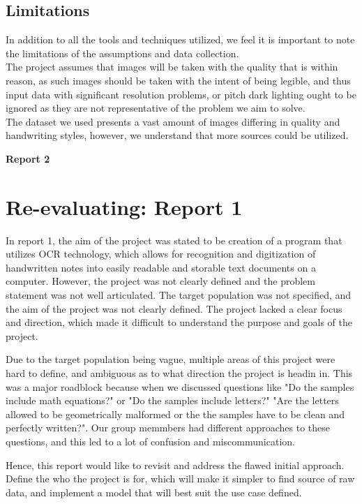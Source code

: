 \documentclass[twoside,a4paper]{article}
\begin{document}
\subsection{Limitations}
In addition to all the tools and techniques utilized, we feel it is important to note the limitations of the assumptions and data collection.\\
The project assumes that images will be taken with the quality that is within reason, as such images should be taken with the intent of being legible, and thus input data with significant resolution problems, or pitch dark lighting ought to be ignored as they are not representative of the problem we aim to solve.\\
The dataset we used presents a vast amount of images differing in quality and handwriting styles, however, we understand that more sources could be utilized.\\


\newpage
\begin{center}
  \textbf{\Large Report 2}
\end{center}

\section{Re-evaluating: Report 1}

In report 1, the aim of the project was stated to be creation of  a program that utilizes OCR technology, which allows for recognition and digitization of handwritten notes 
into easily readable and storable text documents on a computer. However, the project was not clearly defined and the problem statement was not well articulated.
The target population was not specified, and the aim of the project was not clearly defined. The project lacked a clear focus and direction, which made it difficult to understand the purpose and goals of the project.

Due to the target population being vague, multiple areas of this project were hard to define, and ambiguous as to what direction the project is headin in.
This was a major roadblock because when we discussed questions like "Do the samples include math equations?" or "Do the samples include letters?" "Are the letters allowed to be geometrically malformed or the the samples have to be
clean and perfectly written?". Our group memmbers had different approaches to these questions, and this led to a lot of confusion and miscommunication.

Hence, this report would like to revisit and address the flawed initial approach. Define the who the project is for, which will make it simpler to find source of raw data,
and implement a model that will best suit the use case defined.
\end{document}
